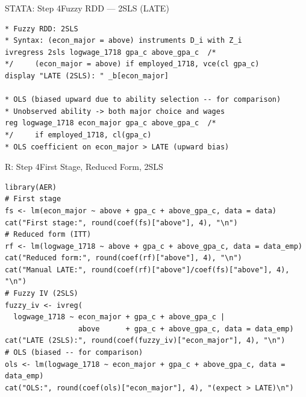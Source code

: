 \documentclass[hyperref={pdfpagelabels=false}]{beamer}
\begin{document}
\begin{frame}[fragile]{STATA: Step 4}{Fuzzy RDD --- 2SLS (LATE)}
\begin{lstlisting}
* Fuzzy RDD: 2SLS
* Syntax: (econ_major = above) instruments D_i with Z_i
ivregress 2sls logwage_1718 gpa_c above_gpa_c  /*
*/     (econ_major = above) if employed_1718, vce(cl gpa_c)
display "LATE (2SLS): " _b[econ_major]

* OLS (biased upward due to ability selection -- for comparison)
* Unobserved ability -> both major choice and wages
reg logwage_1718 econ_major gpa_c above_gpa_c  /*
*/     if employed_1718, cl(gpa_c)
* OLS coefficient on econ_major > LATE (upward bias)
\end{lstlisting}
\end{frame}


\begin{frame}[fragile]{R: Step 4}{First Stage, Reduced Form, 2SLS}
\begin{lstlisting}[style=r-style]
library(AER)
# First stage
fs <- lm(econ_major ~ above + gpa_c + above_gpa_c, data = data)
cat("First stage:", round(coef(fs)["above"], 4), "\n")
# Reduced form (ITT)
rf <- lm(logwage_1718 ~ above + gpa_c + above_gpa_c, data = data_emp)
cat("Reduced form:", round(coef(rf)["above"], 4), "\n")
cat("Manual LATE:", round(coef(rf)["above"]/coef(fs)["above"], 4), "\n")
# Fuzzy IV (2SLS)
fuzzy_iv <- ivreg(
  logwage_1718 ~ econ_major + gpa_c + above_gpa_c |
                 above      + gpa_c + above_gpa_c, data = data_emp)
cat("LATE (2SLS):", round(coef(fuzzy_iv)["econ_major"], 4), "\n")
# OLS (biased -- for comparison)
ols <- lm(logwage_1718 ~ econ_major + gpa_c + above_gpa_c, data = data_emp)
cat("OLS:", round(coef(ols)["econ_major"], 4), "(expect > LATE)\n")
\end{lstlisting}
\end{frame}
\end{document}
